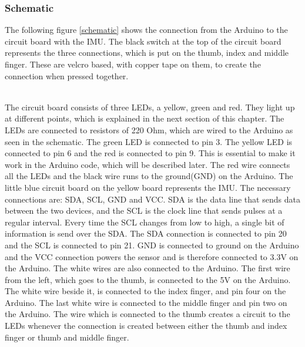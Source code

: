 \subsubsection{Schematic}

The following figure \ref{schematic} shows the connection from the Arduino to the circuit board with the IMU. The black switch at the top of the circuit board
represents the three connections, which is put on the thumb, index and middle finger. These are velcro based, with copper tape on them, to create the connection when pressed together. \\

\begin{minipage}{\linewidth}%
\label{schematic}
\end{minipage}\\

The circuit board consists of three LEDs, a yellow, green and red. They light up at different points, which is explained in the next section of this chapter.
The LEDs are connected to resistors of 220 Ohm, which are wired to the Arduino as seen in the schematic. The green LED is connected to pin 3. 
The yellow LED is connected to pin 6 and the red is connected to pin 9. This is essential to make it work in the Arduino code, which will be described later. 
The red wire connects all the LEDs and the black wire runs to the ground(GND) on the Arduino. The little blue circuit board on the yellow board represents the IMU. The necessary connections are: SDA, SCL, GND and VCC. 
SDA is the data line that sends data between the two devices, and the SCL is the clock line that sends pulses at a regular interval\citep{Arduino_SDA}. Every time the SCL changes from low to high, a single bit of information is send over the SDA.
The SDA connection is connected to pin 20 and the SCL is connected to pin 21. GND is connected to ground on the Arduino and the VCC connection powers the sensor and is therefore connected to 3.3V on the Arduino. The white wires are also connected to the Arduino. The first wire from the left, which goes to the thumb, is connected to the 5V on the Arduino. 
The white wire beside it, is connected to the index finger, and pin four on the Arduino. The last white wire is connected to the middle finger and pin two on the Arduino.
The wire which is connected to the thumb creates a circuit to the LEDs whenever the connection is created between either the thumb and index finger or thumb and middle finger. \\


